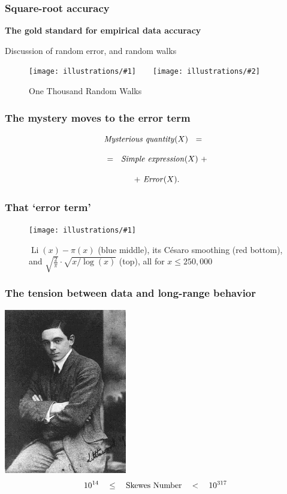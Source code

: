 \documentclass{beamer}
\DeclareMathOperator{\Li}{Li}
\newcommand{\ill}[3]{%
   \begin{figure}[H]%
   \vspace{-2ex}
   \centering%
   \texttt{[image: illustrations/\#1]}%
   \caption{#3}%
   \vspace{-2ex}
    \end{figure}}
\newcommand{\illtwo}[4]{%
   \begin{figure}[H]\centering%
   \texttt{[image: illustrations/\#1]}$\qquad$\texttt{[image: illustrations/\#2]}%
   \caption{#4}%
    \end{figure}}
\begin{document}
\begin{frame}\frametitle{\bf Square-root accuracy}

{\Huge {\bf The gold standard for empirical data accuracy} \vskip10pt

      Discussion of random error, and random walks
      
      
\illtwo{random_walks-1000}{random_walks-1000-mean}{.45}{One Thousand Random Walks\label{fig:random_walks_1000}}}\end{frame}
\begin{frame}\frametitle{\bf {The mystery moves to  the error term}}

{\Huge  $${\it Mysterious\  quantity}(X)\ \ = \ \ $$

$$\ \ =\ \ {\it Simple \ expression}(X) \ + \ $$

$$ \ + \ {\it Error}(X).$$}\end{frame}


\begin{frame}\frametitle{\bf That `error term'}
\ill{li-minus-pi-250000}{.9}{$\Li(x)-\pi(x)$ (blue middle), its C{\'e}saro smoothing (red bottom), and
$\sqrt{\frac{2}{\pi}}\cdot \sqrt{x/\log(x)}$ (top), all for $x\leq 250{,}000$\label{fig:li-minus-pi-250000}}\end{frame}
\begin{frame}\frametitle{\bf The tension between data and long-range behavior}
\hskip100pt \includegraphics[width=0.4\textwidth]{illustrations/littlewood}
{
$$
10^{14}\ \ \ \le\ \ \ {\rm Skewes\ Number}\ \ \ <\ \ \    10^{317}
$$} \end{frame}
\end{document}
